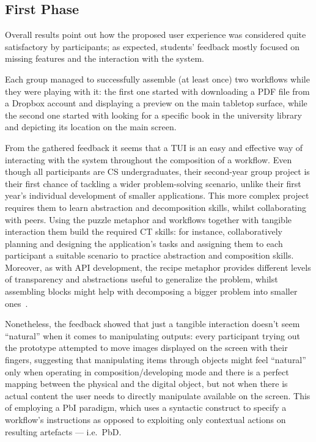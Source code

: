 \subsection{First Phase}
Overall results point out how the proposed user experience was considered quite satisfactory by participants; as expected, students' feedback mostly focused on missing features and the interaction with the system.

Each group managed to successfully assemble (at least once) two workflows while they were playing with it: the first one started with downloading a PDF file from a Dropbox account and displaying a preview on the main tabletop surface, while the second one started with looking for a specific book in the university library and depicting its location on the main screen.

From the gathered feedback it seems that a \ac{TUI} is an easy and effective way of interacting with the system throughout the composition of a workflow. Even though all participants are \ac{CS} undergraduates, their second-year group project is their first chance of tackling a wider problem-solving scenario, unlike their first year's individual development of smaller applications. This more complex project requires them to learn abstraction and decomposition skills, whilst collaborating with peers. Using the puzzle metaphor and workflows together with tangible interaction  them build the required \ac{CT} skills: for instance, collaboratively planning and designing the application's tasks and assigning them to each participant  a suitable scenario to practice abstraction and composition skills. Moreover, as with API development, the recipe metaphor provides different levels of transparency and abstractions useful to generalize the problem, whilst assembling blocks might help with decomposing a bigger problem into smaller ones~\cite{Wing:2008cv}.

Nonetheless, the feedback showed that just a tangible interaction doesn't seem ``natural'' when it comes to manipulating outputs: every participant trying out the prototype attempted to move images displayed on the screen with their fingers, suggesting that manipulating items through objects might feel ``natural'' only when operating in composition/developing mode and there is a perfect mapping between the physical and the digital object, but not when there is actual content the user needs to directly manipulate available on the screen. This  of employing a \ac{PbI} paradigm, which uses a syntactic construct to specify a workflow's instructions as opposed to exploiting only contextual actions on resulting artefacts --- i.e.\ \ac{PbD}.


